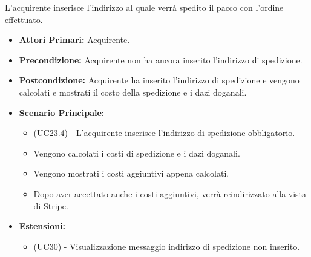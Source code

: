 \resetSubUC

L'acquirente inserisce l'indirizzo al quale verrà spedito il pacco con l'ordine effettuato.
\begin{itemize}
    \item \textbf{Attori Primari:} Acquirente.
    \item \textbf{Precondizione:} Acquirente non ha ancora inserito l'indirizzo di spedizione.
    \item \textbf{Postcondizione:} Acquirente ha inserito l'indirizzo di spedizione e vengono calcolati e mostrati il costo della spedizione e i dazi doganali.
    \item \textbf{Scenario Principale:}
    \begin{itemize}
        \item (UC23.4) - L'acquirente inserisce l'indirizzo di spedizione obbligatorio.
        \item Vengono calcolati i costi di spedizione e i dazi doganali.
        \item Vengono mostrati i costi aggiuntivi appena calcolati.
        \item Dopo aver accettato anche i costi aggiuntivi, verrà reindirizzato alla vista di Stripe.
    \end{itemize}
    \item \textbf{Estensioni:}
    \begin{itemize}
        \item (UC30) - Visualizzazione messaggio indirizzo di spedizione non inserito.
    \end{itemize}
\end{itemize}


